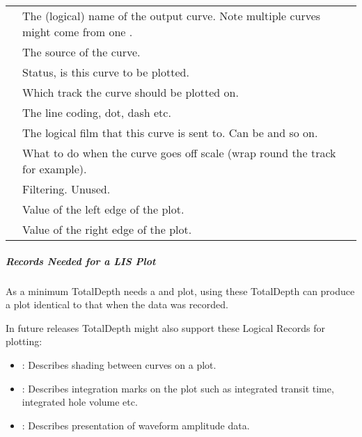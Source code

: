 \documentclass[letterpaper,10pt,english]{sphinxmanual}
\begin{document}
\begin{savenotes}\sphinxattablestart
\centering
\begin{tabulary}{\linewidth}[t]{|T|T|}
\hline
{}\relax &\relax \\
\hline
{}
&
The (logical) name of the output curve. Note multiple curves might come from one .
\\
\hline
{}
&
The source of the curve.
\\
\hline
{}
&
Status, is this curve to be plotted.
\\
\hline
{}
&
Which track the curve should be plotted on.
\\
\hline
{}
&
The line coding, dot, dash etc.
\\
\hline
{}
&
The logical film that this curve is sent to. Can be  and so on.
\\
\hline
{}
&
What to do when the curve goes off scale (wrap round the track for example).
\\
\hline
{}
&
Filtering. Unused.
\\
\hline
{}
&
Value of the left edge of the plot.
\\
\hline
{}
&
Value of the right edge of the plot.
\\
\hline
\end{tabulary}
\par
\sphinxattableend\end{savenotes}


\subparagraph{Records Needed for a LIS Plot}
\label{\detokenize{tech/plotting:records-needed-for-a-lis-plot}}
As a minimum TotalDepth needs a  and  plot, using these TotalDepth can produce a plot identical to that when the data was recorded.

In future releases TotalDepth might also support these Logical Records for plotting:
\begin{itemize}
\item {} 
: Describes shading between curves on a plot.

\item {} 
: Describes integration marks on the plot such as integrated transit time, integrated hole volume etc.

\item {} 
: Describes presentation of waveform amplitude data.

\end{itemize}
\end{document}
